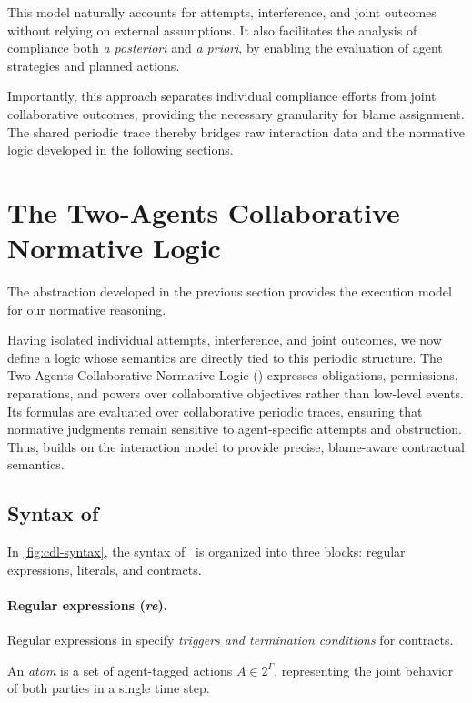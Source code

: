 This model naturally accounts for attempts, interference, and joint outcomes without relying on external assumptions. It also facilitates the analysis of compliance both \emph{a posteriori} and \emph{a priori}, by enabling the evaluation of agent strategies and planned actions.

Importantly, this approach separates individual compliance efforts from joint collaborative outcomes, providing the necessary granularity for blame assignment. The shared periodic trace thereby bridges raw interaction data and the normative logic developed in the following sections.
  
  \section{The Two-Agents Collaborative Normative Logic \cDL}

  The abstraction developed in the previous section provides the execution model for our normative reasoning. 

  Having isolated individual attempts, interference, and joint outcomes, we now define a logic whose semantics are directly tied to this periodic structure. 
  The Two-Agents Collaborative Normative Logic (\cDL) expresses obligations, permissions, reparations, and powers over collaborative objectives rather than low-level events.
Its formulas are evaluated over collaborative periodic traces, ensuring that normative judgments remain sensitive to agent-specific attempts and obstruction.
Thus, \cDL builds on the interaction model to provide precise, blame-aware contractual semantics.



  \subsection{Syntax of \cDL}

  In \ref{fig:cdl-syntax}, the syntax of \cDL\ is organized into three blocks: regular expressions, literals, and contracts.



  \paragraph{Regular expressions (\emph{re}).}

Regular expressions in \cDL specify \emph{triggers and termination conditions} for contracts.

  An \emph{atom} is a set of agent-tagged actions \(A \in 2^\Gamma\), representing the joint behavior of both parties in a single time step. 

